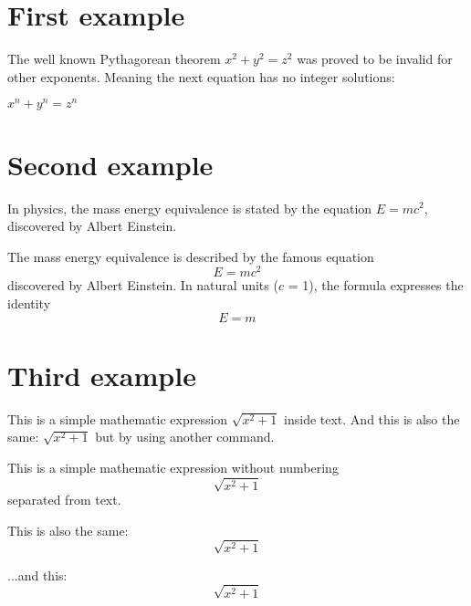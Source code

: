 \documentclass{article}
\begin{document}
    \section{First example}

    The well known Pythagorean theorem \(x^2 + y^2 = z^2\) was
    proved to be invalid for other exponents.
    Meaning the next equation has no integer solutions:

    \(x^n + y^n = z^n \)



    \section{Second example}

    In physics, the mass energy equivalence is stated by the equation $E=mc^2$, discovered by Albert Einstein.

    The mass    energy equivalence is described by the famous equation
    \[ E=mc^2 \]
    discovered by Albert Einstein.
    In natural units ($c$ = 1), the formula expresses the identity
    \begin{equation}
        E=m
    \end{equation}

    \section{Third example}

    This is a simple mathematic expression \(\sqrt{x^2+1}\) inside text.
    And this is also the same:
    \begin{math}
        \sqrt{x^2+1}
    \end{math}
    but by using another command.

    This is a simple mathematic expression without numbering
    \[\sqrt{x^2+1}\]
    separated from text.

    This is also the same:
    \begin{displaymath}
        \sqrt{x^2+1}
    \end{displaymath}

    ...and this:
    \begin{equation*}
        \sqrt{x^2+1}
    \end{equation*}
\end{document}
